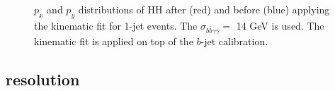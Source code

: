 \begin{figure}[htbp]
   \centering
   \begin{tcolorbox}[colback=black!5!white,colframe=white!75!black]
   \caption{$p_x$ and $p_y$ distributions of HH after (red) and before (blue) applying the kinematic fit for 1-jet events. The $\sigma_{b\bar{b}\gamma\gamma} = $ 14 GeV is used. The kinematic fit is applied on top of the $b$-jet calibration.}
   \label{fig:Adx4:HH:1Jet}
   \end{tcolorbox}
   
\end{figure}

\subsection{\mbb resolution}

